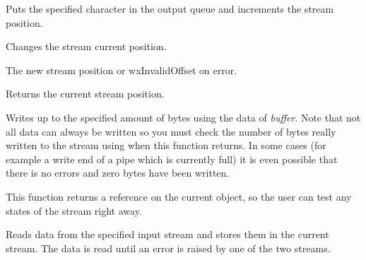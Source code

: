 \label{wxoutputstreamputc}


Puts the specified character in the output queue and increments the
stream position.


\label{wxoutputstreamseeko}


Changes the stream current position.





The new stream position or wxInvalidOffset on error.


\label{wxoutputstreamtello}


Returns the current stream position.


\label{wxoutputstreamwrite}


Writes up to the specified amount of bytes using the data of {\it buffer}. Note
that not all data can always be written so you must check the number of bytes
really written to the stream using  
when this function returns. In some cases (for example a write end of a pipe
which is currently full) it is even possible that there is no errors and zero
bytes have been written.

This function returns a reference on the current object, so the user can test
any states of the stream right away.


Reads data from the specified input stream and stores them 
in the current stream. The data is read until an error is raised
by one of the two streams.

